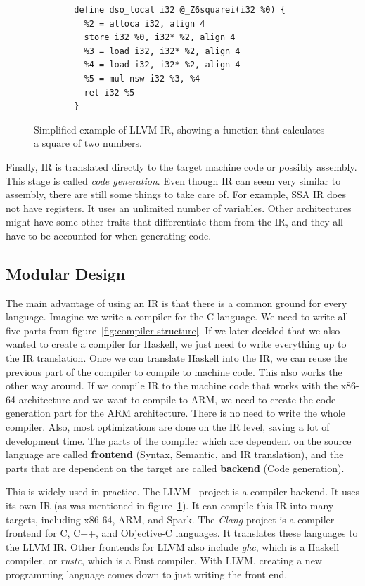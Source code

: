 \begin{figure}
    \begin{verbatim}
        define dso_local i32 @_Z6squarei(i32 %0) {
          %2 = alloca i32, align 4
          store i32 %0, i32* %2, align 4
          %3 = load i32, i32* %2, align 4
          %4 = load i32, i32* %2, align 4
          %5 = mul nsw i32 %3, %4
          ret i32 %5
        }
    \end{verbatim}
    \caption{Simplified example of LLVM IR, showing a function that calculates
    a square of two numbers.}
    \label{fig:llvm-ir-example}
\end{figure}

Finally, IR is translated directly to the target machine code or possibly
assembly. This stage is called \textit{code generation}. Even though IR can
seem very similar to assembly, there are still some things to take care of. For
example, SSA IR does not have registers. It uses an unlimited number of
variables. Other architectures might have some other traits that differentiate
them from the IR, and they all have to be accounted for when generating code.

\subsection{Modular Design}
The main advantage of using an IR is that there is a common ground for every
language. Imagine we write a compiler for the C language. We need to write all
five parts from figure~\ref{fig:compiler-structure}. If we later decided that
we also wanted to create a compiler for Haskell, we just need to write
everything up to the IR translation. Once we can translate Haskell into the IR,
we can reuse the previous part of the compiler to compile to machine code. This
also works the other way around. If we compile IR to the machine code that
works with the x86-64 architecture and we want to compile to ARM, we need to
create the code generation part for the ARM architecture. There is no need to
write the whole compiler. Also, most optimizations are done on the IR level,
saving a lot of development time. The parts of the compiler which are dependent
on the source language are called \textbf{frontend} (Syntax, Semantic, and IR
translation), and the parts that are dependent on the target are called
\textbf{backend} (Code generation).

This is widely used in practice. The LLVM~\cite{llvm} project is a compiler
backend. It uses its own IR (as was mentioned in
figure~\ref{fig:llvm-ir-example}). It can compile this IR into many targets,
including x86-64, ARM, and Spark. The \textit{Clang} project is a compiler
frontend for C, C++, and Objective-C languages. It translates these languages
to the LLVM IR. Other frontends for LLVM also include \textit{ghc}, which is a
Haskell compiler, or \textit{rustc}, which is a Rust compiler. With LLVM,
creating a new programming language comes down to just writing the front end.

